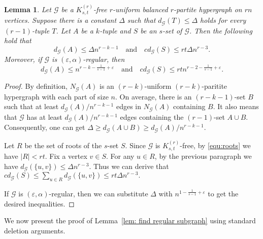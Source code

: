 \documentclass[11pt]{article}
\newtheorem{lem}[dfn]{Lemma}
\begin{document}
\begin{lem}\label{lem: set degree}
Let $\mathcal G$ be a $K_{s,t}^{(r)}$-free $r$-uniform balanced $r$-partite hypergraph on $rn$ vertices.
Suppose there is a constant $\Delta$ such that $d_{\mathcal G}(T)\le \Delta$ holds for every $(r-1)$-tuple $T$.
Let $A$ be a $k$-tuple and $S$ be an $s$-set of $\mathcal{G}$. Then the following hold that
$$ d_{\mathcal G}(A)\le  \Delta n^{r-k-1  }  \text{ ~ and ~ } cd_{\mathcal G}(S)\le rt\Delta n^{r-3}   .$$
Moreover, if $\mathcal G$ is $( \varepsilon,\alpha)$-regular, then
$$ d_{\mathcal G}(A)\le n^{r-k -\frac{1}{s-1}+  \varepsilon}  \text{ ~ and ~ }  cd_{\mathcal G}(S)\le  rtn^{r-2 -\frac{1}{s-1}+  \varepsilon  }  .$$
\end{lem}
\begin{proof}
By definition, $N_{\mathcal G}(A)$ is an $(r-k)$-uniform $(r-k)$-paritite hypergraph with each part of size $n$.
On average, there is an $(r-k-1)$-set $B$ such that at least $d_{\mathcal G}(A) /n^{r-k-1} $ edges in $N_{\mathcal G}(A)$ containing $B$.
It also means that $\mathcal G$ has at least $d_{\mathcal G}(A) /n^{r-k-1} $ edges containing the $(r-1)$-set  $A\cup B$.
Consequently, one can get $\Delta \ge d_{\mathcal G}(A\cup B)\ge d_{\mathcal G}(A) /n^{r-k-1}$.

Let $R$ be the set of roots of the $s$-set $S$. Since $\mathcal G$ is $K_{s,t}^{(r)}$-free, by \eqref{equ:roots} we have $|R|<rt$.
Fix a vertex $v\in S$. For any $u\in R$, by the previous paragraph we have $d_{\mathcal G}(\{u,v\})\le \Delta n^{r-3}.$
Thus we can derive that $cd_{\mathcal G}(S)\le \sum_{u\in R}d_{\mathcal G}(\{u,v\})\le rt\Delta n^{r-3}.$

If $\mathcal G$ is $( \varepsilon,\alpha)$-regular, then we can substitute $\Delta $ with $n^{1-\frac{1}{s-1}+ \varepsilon }$ to get the desired inequalities.
\end{proof}

We now present the proof of Lemma~\ref{lem: find regular subgraph} using standard deletion arguments.
\end{document}
